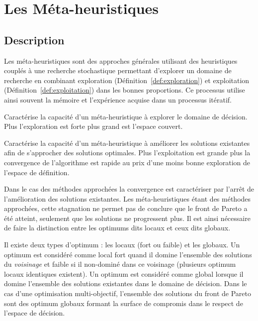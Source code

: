 \section{Les Méta-heuristiques} %
\label{sec:les_meta_heuristiques}
\subsection{Description} %
\label{sub:description}
Les méta-heuristiques sont des approches générales utilisant des heuristiques
couplés à une recherche stochastique permettant d’explorer un domaine de recherche
en combinant exploration (Définition~\ref{def:exploration}) et exploitation (Définition~\ref{def:exploitation})
dans les bonnes proportions. Ce processus utilise ainsi souvent la mémoire et
l’expérience acquise dans un processus itératif.

\begin{Def}[Exploration]\label{def:exploration}
Caractérise la capacité d’un méta-heuristique à explorer le domaine de décision.
Plus l’exploration est forte plus grand est l’espace couvert.
\end{Def}

\begin{Def}[Exploitation]\label{def:exploitation}
Caractérise la capacité d’un méta-heuristique à améliorer les solutions existantes
afin de s’approcher des solutions optimales. Plus l’exploitation est grande plus
la convergence de l’algorithme est rapide au prix d’une moins bonne exploration
de l’espace de définition.
\end{Def}

\begin{Def}[Convergence]\label{def:convergence}
Dans le cas des méthodes approchées la convergence est caractériser par l’arrêt
de l’amélioration des solutions existantes. Les méta-heuristiques étant des méthodes
approchées, cette stagnation ne permet pas de conclure que le front de Pareto a été
atteint, seulement que les solutions ne progressent plus. Il est ainsi nécessaire
de faire la distinction entre les optimums dits locaux et ceux dits globaux.
\end{Def}

\begin{Def}\label{def:optimum}
Il existe deux types d’optimum : les locaux (fort ou faible) et les globaux.
Un optimum est considéré comme local fort quand il domine l’ensemble des solutions
du \emph{voisinage} et faible si il non-dominé dans ce voisinage (plusieurs
optimum locaux identiques existent). Un optimum est considéré comme global lorsque il domine
l’ensemble des solutions existantes dans le domaine de décision. Dans le cas d’une
optimisation multi-objectif, l’ensemble des solutions du front de Pareto sont des
optimum globaux formant la surface de compromis dans le respect de l’espace de
décision.
\end{Def}


